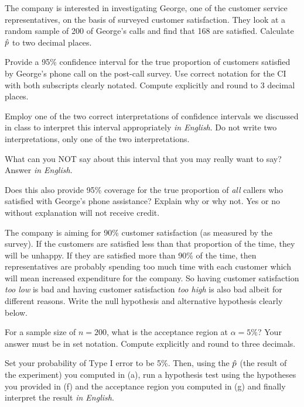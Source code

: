 \documentclass[12pt]{article}
\begin{document}
\benum

 The company is interested in investigating George, one of the customer service representatives, on the basis of surveyed customer satisfaction. They look at a random sample of 200 of George's calls and find that 168 are satisfied. Calculate $\hat{p}$ to two decimal places. 

 Provide a 95\% confidence interval for the true proportion of customers satisfied by George's phone call on the post-call survey.  Use correct notation for the CI with both subscripts clearly notated. Compute explicitly and round to 3 decimal places.

 Employ one of the two correct interpretations of confidence intervals we discussed in class to interpret this interval appropriately \textit{in English}. Do not write two interpretations, only one of the two interpretations. 

 What can you NOT say about this interval that you may really want to say? Answer \textit{in English}. 

 Does this also provide 95\% coverage for the true proportion of \textit{all}  callers who satisfied with George's phone assistance? Explain why or why not. Yes or no without explanation will not receive credit.

 The company is aiming for 90\% customer satisfaction (as measured by the survey). If the customers are satisfied less than that proportion of the time, they will be unhappy. If they are satisfied more than 90\% of the time, then representatives are probably spending too much time with each customer which will mean increased expenditure for the company. So having customer satisfaction\textit{ too low} is bad and having customer satisfaction \textit{too high }is also bad albeit for different reasons. Write the null hypothesis and alternative hypothesis clearly below. 

 For a sample size of $n=200$, what is the acceptance region at $\alpha = 5\%$? Your answer must be in set notation. Compute explicitly and round to three decimals. 

 Set your probability of Type I error to be 5\%. Then, using the $\hat{p}$ (the result of the experiment) you computed in (a), run a hypothesis test using the hypotheses you provided in (f) and the acceptance region you computed in (g) and finally interpret the result \textit{in English}. 
\end{document}
